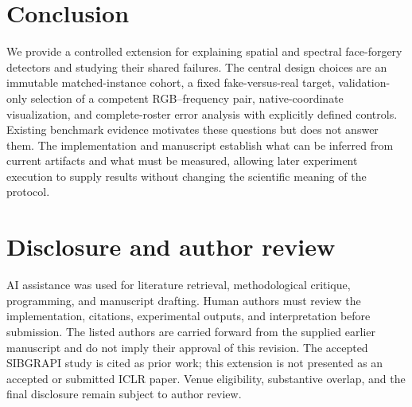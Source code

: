 \documentclass[conference,10pt,letterpaper]{IEEEtran}
\begin{document}
\section{Conclusion}
We provide a controlled extension for explaining spatial and spectral face-forgery detectors and studying their shared failures. The central design choices are an immutable matched-instance cohort, a fixed fake-versus-real target, validation-only selection of a competent RGB--frequency pair, native-coordinate visualization, and complete-roster error analysis with explicitly defined controls. Existing benchmark evidence motivates these questions but does not answer them. The implementation and manuscript establish what can be inferred from current artifacts and what must be measured, allowing later experiment execution to supply results without changing the scientific meaning of the protocol.

\section*{Disclosure and author review}
AI assistance was used for literature retrieval, methodological critique, programming, and manuscript drafting. Human authors must review the implementation, citations, experimental outputs, and interpretation before submission. The listed authors are carried forward from the supplied earlier manuscript and do not imply their approval of this revision. The accepted SIBGRAPI study is cited as prior work; this extension is not presented as an accepted or submitted ICLR paper. Venue eligibility, substantive overlap, and the final disclosure remain subject to author review.

\balance


\end{document}
